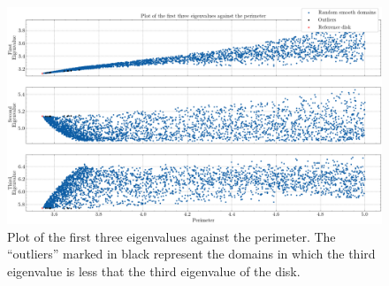 \begin{figure}[!htb]
    \centering
    \begin{minipage}[c]{0.8\textwidth}
        \centering
        \includegraphics[width=\textwidth]{Images/Dirac/smooth/smooth_domains_scatter_all_eigs_.png}
        \caption{Plot of the first three eigenvalues against the perimeter. The ``outliers'' marked in black represent the domains in which the third eigenvalue is less that the third eigenvalue of the disk.}
        \label{dirac_smooth_domains_scatter_all_eigs}
    \end{minipage}

    \vspace{0.5cm}


\end{figure}
